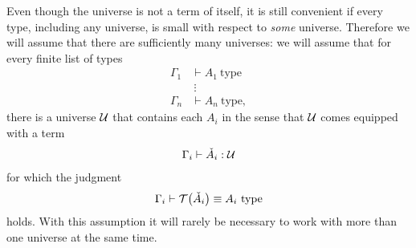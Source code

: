   Even though the universe is not a term of itself, it is still convenient if every type, including any universe, is small with respect to \emph{some} universe. Therefore we will assume that there are sufficiently many universes: we will assume that for every finite list of types
\begin{align*}
  \Gamma_1 & \vdash A_1~\mathrm{type} \\
  & ~\vdots \\
  \Gamma_n & \vdash A_n~\mathrm{type},
\end{align*}
there is a universe $\mathcal{U}$ that contains each $A_i$ in the sense that $\mathcal{U}$ comes equipped with a term
\begin{align*}
  \Gamma_i\vdash \check{A}_i:\mathcal{U}
\end{align*}
for which the judgment
\begin{equation*}
  \Gamma_i\vdash \mathcal{T}\big(\check{A}_i\big)\equiv A_i~\mathrm{type}
\end{equation*}
holds. With this assumption it will rarely be necessary to work with more than one universe at the same time.

